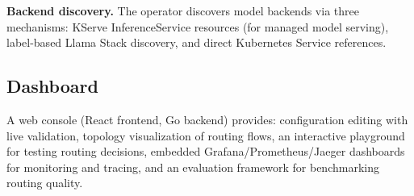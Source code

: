 \noindent\textbf{Backend discovery.}
The operator discovers model backends via three mechanisms:
KServe InferenceService resources (for managed model serving),
label-based Llama Stack discovery, and
direct Kubernetes Service references.

\subsection{Dashboard}

A web console (React frontend, Go backend) provides:
configuration editing with live validation,
topology visualization of routing flows,
an interactive playground for testing routing decisions,
embedded Grafana/Prometheus/Jaeger dashboards for monitoring and tracing, and
an evaluation framework for benchmarking routing quality.
